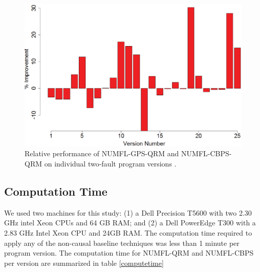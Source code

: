 \documentclass[times]{stvrauth}
\begin{document}
\begin{figure}[!thpb]
\centering
\includegraphics[width=\textwidth]{CBPS_VS_GPS_MultipleFault.eps}
\caption{Relative performance of NUMFL-GPS-QRM and NUMFL-CBPS-QRM on individual two-fault program versions .}
\label{CBPS_VS_GPS_MultipleFault}
\end{figure}

\subsection{Computation Time}
We used two machines for this study: (1) a Dell Precision T5600 with two 2.30 GHz intel Xeon CPUs and 64 GB RAM; and (2) a Dell PowerEdge T300 with a 2.83 GHz Intel Xeon CPU and 24GB RAM. The computation time required to apply any of the non-causal baseline techniques was less than 1 minute per program version. The computation time for NUMFL-QRM and NUMFL-CBPS per version are summarized in table \ref{computetime}
\end{document}
